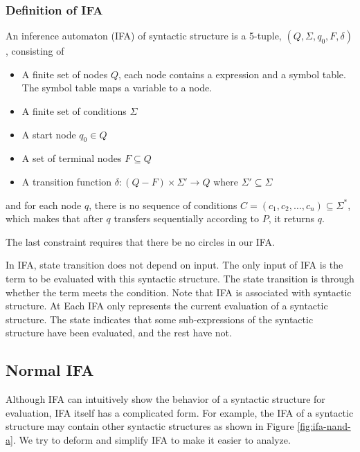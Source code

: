 \subsubsection{Definition of IFA}

\begin{Def}

An inference automaton (IFA) of syntactic structure  is a 5-tuple, $(Q, \Sigma, q_0, F, \delta)$, consisting of

\begin{itemize}
    \item A finite set of nodes $Q$, each node contains a expression and a symbol table. The symbol table maps a variable to a node.
    \item A finite set of conditions $\Sigma$
    \item A start node $q_0 \in Q$
    \item A set of terminal nodes $F \subseteq Q$ 
    \item A transition function $\delta: (Q-F) \times \Sigma' \to Q$ where $\Sigma' \subseteq \Sigma$
\end{itemize}

and for each node $q$, there is no sequence of conditions $C = (c_1,c_2,\ldots,c_n)\subseteq \Sigma^*$, which makes that after $q$ transfers sequentially according to $P$, it returns $q$.

\end{Def}

The last constraint requires that there be no circles in our IFA.

In IFA, state transition does not depend on input. The only input of IFA is the term to be evaluated with this syntactic structure. The state transition is through whether the term meets the condition. Note that IFA is associated with syntactic structure. At Each IFA only represents the current evaluation of a syntactic structure. The state indicates that some sub-expressions of the syntactic structure have been evaluated, and the rest have not.

\subsection{Normal IFA}

Although IFA can intuitively show the behavior of a syntactic structure for evaluation, IFA itself has a complicated form. For example, the IFA of a syntactic structure may contain other syntactic structures as shown in Figure \ref{fig:ifa-nand-a}. We try to deform and simplify IFA to make it easier to analyze.

